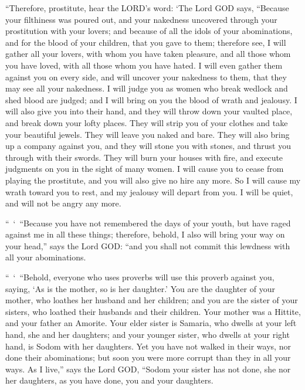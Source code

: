 \myverse{}“Therefore, prostitute, hear the LORD’s word:
\myverse{}‘The Lord GOD says, “Because your filthiness was poured out, and your nakedness
uncovered through your prostitution with your lovers; and because of all the idols of your abominations,
and for the blood of your children, that you gave to them;
\myverse{}therefore see, I will gather all your lovers, with whom you have taken pleasure,
and all those whom you have loved, with all those whom you have hated. I will even gather them against
you on every side, and will uncover your nakedness to them, that they may see all your nakedness.
\myverse{}I will judge you as women who break wedlock and shed blood are judged; and
I will bring on you the blood of wrath and jealousy.
\myverse{}I will also give you into their hand, and they will throw down your vaulted
place, and break down your lofty places. They will strip you of your clothes and take your beautiful jewels.
They will leave you naked and bare.
\myverse{}They will also bring up a company against you, and they will stone you with
stones, and thrust you through with their swords.
\myverse{}They will burn your houses with fire, and execute judgments on you in the
sight of many women. I will cause you to cease from playing the prostitute, and you will also give no
hire any more.
\myverse{}So I will cause my wrath toward you to rest, and my jealousy will depart
from you. I will be quiet, and will not be angry any more.

\myverse{}“ ‘ “Because you have not remembered the days of your youth, but
have raged against me in all these things; therefore, behold, I also will bring your way on your head,”
says the Lord GOD: “and you shall not commit this lewdness with all your abominations.

\myverse{}“ ‘ “Behold, everyone who uses proverbs will use this proverb
against you, saying, ‘As is the mother, so is her daughter.’
\myverse{}You are the daughter of your mother, who loathes her husband and her children;
and you are the sister of your sisters, who loathed their husbands and their children. Your mother was
a Hittite, and your father an Amorite.
\myverse{}Your elder sister is Samaria, who dwells at your left hand, she and her daughters;
and your younger sister, who dwells at your right hand, is Sodom with her daughters.
\myverse{}Yet you have not walked in their ways, nor done their abominations; but soon
you were more corrupt than they in all your ways.
\myverse{}As I live,” says the Lord GOD, “Sodom your sister has not done, she nor her
daughters, as you have done, you and your daughters.


